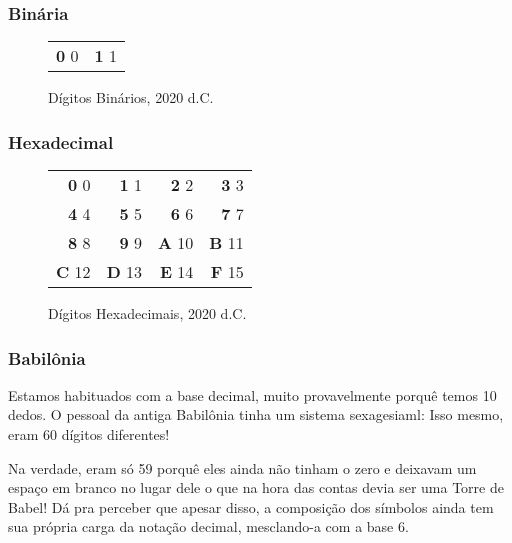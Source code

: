 \documentclass[12pt]{article}
\begin{document}

	\subsubsection*{Binária}
	
	\begin{figure}[H]
	\centering
	\begin{tabular}{rr}
	\textbf{0} \phantom{0}0 & \textbf{1} \phantom{0}1
	\end{tabular}
	\caption{Dígitos Binários, 2020 d.C.}
	\end{figure}
	
	\subsubsection*{Hexadecimal}
	
	\begin{figure}[H]
	\centering
	\begin{tabular}{rrrr}
	\textbf{0} \phantom{1}0 & \textbf{1} \phantom{1}1 & \textbf{2} \phantom{1}2 & \textbf{3} \phantom{1}3\\
	\textbf{4} \phantom{1}4 & \textbf{5} \phantom{1}5 & \textbf{6} \phantom{1}6 & \textbf{7} \phantom{1}7\\
	\textbf{8} \phantom{1}8 & \textbf{9} \phantom{1}9 & \textbf{A} 10 & \textbf{B} 11\\
	\textbf{C} 12 & \textbf{D} 13 & \textbf{E} 14 & \textbf{F} 15
	\end{tabular}
	\caption{Dígitos Hexadecimais, 2020 d.C.}
	\end{figure}
			
	
	\subsubsection*{Babilônia}
	
	Estamos habituados com a base decimal, muito provavelmente porquê temos 10 dedos. O pessoal da antiga Babilônia tinha um sistema sexagesiaml: Isso mesmo, eram 60 dígitos diferentes!
	
	
	Na verdade, eram só 59 porquê eles ainda não tinham o zero e deixavam um espaço em branco no lugar dele o que na hora das contas devia ser uma Torre de Babel! Dá pra perceber que apesar disso, a composição dos símbolos ainda tem sua própria carga da notação decimal, mesclando-a com a base 6.\\
	
\end{document}

